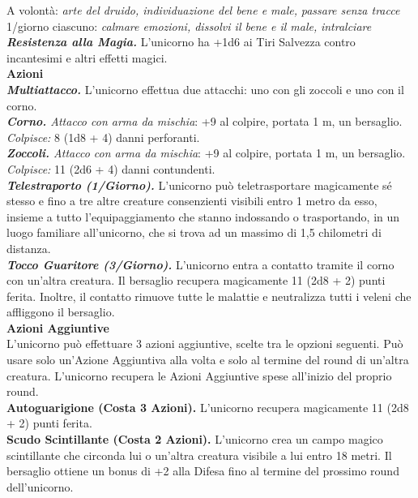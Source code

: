 \begin{multicols}{2}
A volontà: \emph{arte del druido, individuazione del bene e male,} \emph{passare senza tracce}\\
1/giorno ciascuno: \emph{calmare emozioni, dissolvi il bene e il male,} \emph{intralciare}\\
\emph{\textbf{Resistenza alla Magia.}} L'unicorno ha +1d6 ai Tiri Salvezza contro incantesimi e altri effetti magici.\\
\smallskip\textbf{Azioni}\\
\emph{\textbf{Multiattacco.}} L'unicorno effettua due attacchi: uno con gli zoccoli e uno con il corno.\\
\emph{\textbf{Corno.} Attacco con arma da mischia}: +9 al colpire, portata 1 m, un bersaglio.\\
\emph{Colpisce:} 8 (1d8 + 4) danni perforanti.\\
\emph{\textbf{Zoccoli.} Attacco con arma da mischia}: +9 al colpire, portata 1 m, un bersaglio.\\
\emph{Colpisce:} 11 (2d6 + 4) danni contundenti.\\
\emph{\textbf{Telestraporto (1/Giorno).}} L'unicorno può teletrasportare magicamente sé stesso e fino a tre altre creature consenzienti visibili entro 1 metro da esso, insieme a tutto l'equipaggiamento che stanno indossando o trasportando, in un luogo familiare all'unicorno, che si trova ad un massimo di 1,5 chilometri di distanza.\\
\emph{\textbf{Tocco Guaritore (3/Giorno).}} L'unicorno entra a contatto tramite il corno con un'altra creatura. Il bersaglio recupera magicamente 11 (2d8 + 2) punti ferita. Inoltre, il contatto rimuove tutte le malattie e neutralizza tutti i veleni che affliggono il bersaglio.\\
\textbf{Azioni Aggiuntive}\\
L'unicorno può effettuare 3 azioni aggiuntive, scelte tra le opzioni seguenti. Può usare solo un'Azione Aggiuntiva alla volta e solo al termine del round di un'altra creatura. L'unicorno recupera le Azioni Aggiuntive spese all'inizio del proprio round.\\
\textbf{Autoguarigione (Costa 3 Azioni).} L'unicorno recupera magicamente 11 (2d8 + 2) punti ferita.\\
\textbf{Scudo Scintillante (Costa 2 Azioni).} L'unicorno crea un campo magico scintillante che circonda lui o un'altra creatura visibile a lui entro 18 metri. Il bersaglio ottiene un bonus di +2 alla Difesa fino al termine del prossimo round dell'unicorno.\\

\end{multicols}
